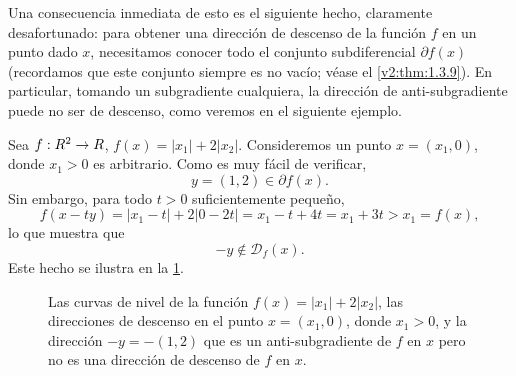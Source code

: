 Una consecuencia inmediata de esto es el siguiente hecho, claramente desafortunado: para obtener una dirección de descenso de la función $f$ en un punto dado $x$, necesitamos conocer todo el conjunto subdiferencial $\partial f(x)$ (recordamos que este conjunto siempre es no vacío; véase el \cref{v2:thm:1.3.9}). En particular, tomando un subgradiente cualquiera, la dirección de anti-subgradiente puede no ser de descenso, como veremos en el siguiente ejemplo.

\begin{example}\label{v2:exa:5.0.1}
    Sea $f : R^2 \to R$, $f(x) = |x_1| + 2|x_2|$. Consideremos un punto $x = (x_1, 0)$, donde $x_1 > 0$ es arbitrario. Como es muy fácil de verificar,
    \[
        y = (1, 2) \in \partial f(x).
    \]
    Sin embargo, para todo $t > 0$ suficientemente pequeño,
    \[
        f(x - ty) = |x_1 - t| + 2|0 - 2t| = x_1 - t + 4t = x_1 + 3t > x_1 = f(x),
    \]
    lo que muestra que
    \[
        -y \notin \mathcal{D}_f(x).
    \]
    Este hecho se ilustra en la \cref{v2:fig:5.0.1}.
\end{example}

\begin{figure}[htpb]
    \centering
    \caption{Las curvas de nivel de la función $f(x) = |x_1| + 2|x_2|$, las direcciones de descenso en el punto $x = (x_1, 0)$, donde $x_1 > 0$, y la dirección $-y = -(1, 2)$ que es un anti-subgradiente de $f$ en $x$ pero no es una dirección de descenso de $f$ en $x$.}
    \label{v2:fig:5.0.1}
\end{figure}

